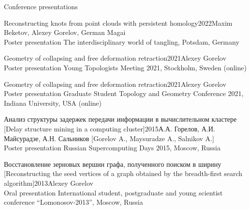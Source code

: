 \documentclass{resume}
\begin{document}
\begin{rSection}{Conference presentations}
  \begin{rSubsection}{Reconstructing knots from point clouds with persistent homology}{2022}{Maxim
      Beketov, Alexey Gorelov, German Magai \\ Poster presentation}
    The interdisciplinary world of tangling, Potsdam, Germany
  \end{rSubsection}

  \begin{rSubsection}{Geometry of collapsing and free deformation retraction}{2021}{Alexey Gorelov
      \\ Poster presentation}
    Young Topologists Meeting 2021, Stockholm, Sweden (online)
  \end{rSubsection}

  \begin{rSubsection}{Geometry of collapsing and free deformation retraction}{2021}{Alexey Gorelov
      \\ Poster presentation}
    Graduate Student Topology and Geometry Conference 2021, Indiana University, USA (online)
  \end{rSubsection}

  \begin{rSubsection}{Анализ структуры задержек передачи информации в вычислительном кластере [Delay
      structure mining in a computing cluster]}{2015}{А.А. Горелов, А.И. Майсурадзе, А.Н. Сальников
      [Gorelov A., Maysuradze A., Salnikov A.] \\ Poster presentation}
    Russian Supercomputing Days 2015, Moscow, Russia
  \end{rSubsection}

  \begin{rSubsection}{Восстановление зерновых вершин графа, полученного поиском в
      ширину [Reconstructing the seed vertices of a graph obtained by the breadth-first search
      algorithm]}{2013}{Alexey Gorelov \\ Oral presentation}
    International student, postgraduate and young scientist conference ``Lomonosov-2013'', Moscow, Russia
  \end{rSubsection}
\end{rSection}
\end{document}
